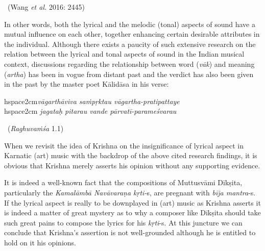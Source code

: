 {\vspace{-.3cm}

\begin{myquote}

~\hfill (Wang \textit{et al.} 2016: 2445)
\end{myquote}

In other words, both the lyrical and the melodic (tonal) aspects of sound have a mutual influence on each other, together enhancing certain desirable attributes in the individual. Although there exists a paucity of such extensive research on the relation between the lyrical and tonal aspects of sound in the Indian musical context, discussions regarding the relationship between word (\textit{vāk}) and meaning (\textit{artha}) has been in vogue from distant past and the verdict has also been given in the past by the master poet Kālidāsa in his verse:

\vspace{.1cm}

\begin{myquote}
hspace{2cm}\textit{vāgarthāviva saṁpṛktau vāgartha-pratipattaye  }\\hspace{2cm} \textit{jagataḥ pitarau vande pārvatī-parameśvarau } 

~\hfill (\textit{Raghuvaṁśa} 1.1)
\end{myquote}

\vspace{.1cm}

When we revisit the idea of Krishna on the insignificance of lyrical aspect in Karnatic (art) music with the backdrop of the above cited research findings, it is obvious that Krishna merely asserts his opinion without any supporting evidence.

It is indeed a well-known fact that the compositions of Muttusvāmi Dīkṣita, particularly the \textit{Kamalāmbā Navāvaraṇa kṛti-}s, are pregnant with \textit{bīja mantra}-s. If the lyrical aspect is really to be downplayed in (art) music as Krishna asserts it is indeed a matter of great mystery as to why a composer like Dīkṣita should take such great pains to compose the lyrics for his \textit{kṛti}-s. At this juncture we can conclude that Krishna’s assertion is not well-grounded although he is entitled to hold on it his opinions.

}
